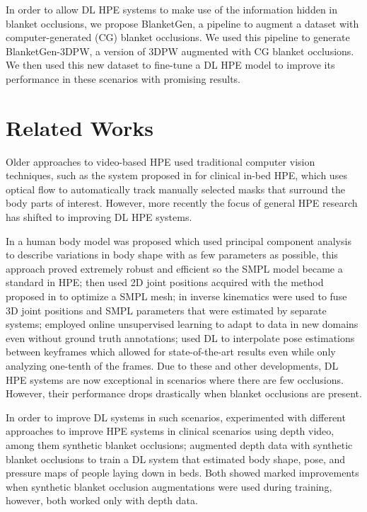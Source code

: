 \documentclass[conference]{IEEEtran}
\begin{document}
In order to allow DL HPE systems to make use of the information hidden in blanket occlusions, we propose BlanketGen, a pipeline to augment a dataset with computer-generated (CG) blanket occlusions. We used this pipeline to generate BlanketGen-3DPW, a version of 3DPW \cite{3DPW} augmented with CG blanket occlusions. We then used this new dataset to fine-tune a DL HPE model to improve its performance in these scenarios with promising results.


\section{Related Works}
Older approaches to video-based HPE used traditional computer vision techniques, such as the system proposed in \cite{neurokinect} for clinical in-bed HPE, which uses optical flow to automatically track manually selected masks that surround the body parts of interest. 
However, more recently the focus of general HPE research has shifted to improving DL HPE systems. 

In \cite{smpl} a human body model was proposed which used principal component analysis to describe variations in body shape with as few parameters as possible, this approach proved extremely robust and efficient so the SMPL model became a standard in HPE; \cite{keepItSMPL} then used 2D joint positions acquired with the method proposed in \cite{deepCut} to optimize a SMPL mesh; in \cite{hybrik} inverse kinematics were used to fuse 3D joint positions and SMPL parameters that were estimated by separate systems; \cite{dynaboa} employed online unsupervised learning to adapt to data in new domains even without ground truth annotations; \cite{deciwatch} used DL to interpolate pose estimations between keyframes which allowed for state-of-the-art results even while only analyzing one-tenth of the frames. 
Due to these and other developments, DL HPE systems are now exceptional in scenarios where there are few occlusions. However, their performance drops drastically when blanket occlusions are present.

In order to improve DL systems in such scenarios, \cite{patientMoCap} experimented with different approaches to improve HPE systems in clinical scenarios using depth video, among them synthetic blanket occlusions; \cite{clever2021} augmented depth data with synthetic blanket occlusions to train a DL system that estimated body shape, pose, and pressure maps of people laying down in beds. Both showed marked improvements when synthetic blanket occlusion augmentations were used during training, however, both worked only with depth data.
\end{document}
